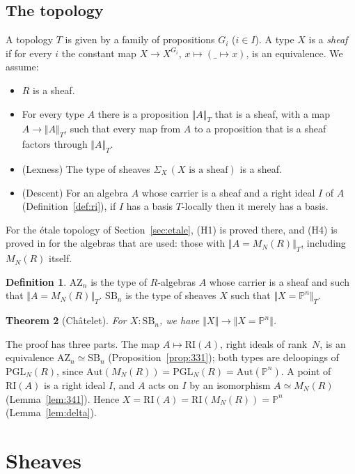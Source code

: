 \documentclass[11pt]{amsart}
\newtheorem{theorem}{Theorem}[section]
\theoremstyle{definition}
\newtheorem{definition}[theorem]{Definition}
\theoremstyle{remark}
\newcommand{\Pn}{\mathbb{P}^n}
\newcommand{\M}{M_N(R)}
\newcommand{\AZ}{\mathrm{AZ}_n}
\newcommand{\SB}{\mathrm{SB}_n}
\newcommand{\RI}{\mathrm{RI}}
\newcommand{\PGL}{\mathrm{PGL}_N(R)}
\newcommand{\Aut}{\mathrm{Aut}}
\newcommand{\tr}[1]{\Vert #1\Vert}
\newcommand{\trT}[1]{\Vert #1\Vert_T}
\begin{document}
\subsection*{The topology}
A topology $T$ is given by a family of propositions $G_i$ ($i\in I$). A type
$X$ is a \emph{sheaf} if for every $i$ the constant map $X\to X^{G_i}$,
$x\mapsto(\_\mapsto x)$, is an equivalence. We assume:
\begin{itemize}
\item[(H1)] $R$ is a sheaf.
\item[(H2)] For every type $A$ there is a proposition $\trT{A}$ that is a
  sheaf, with a map $A\to\trT A$, such that every map from $A$ to a
  proposition that is a sheaf factors through $\trT A$.
\item[(H3)] (Lexness) The type of sheaves $\Sigma_{X} \,(X\text{ is a sheaf})$
  is a sheaf.
\item[(H4)] (Descent) For an algebra $A$ whose carrier is a sheaf and a
  right ideal $I$ of $A$ (Definition~\ref{def:ri}), if $I$ has a basis
  $T$-locally then it merely has a basis.
\end{itemize}
For the \'etale topology of Section~\ref{sec:etale}, (H1) is proved there,
and (H4) is proved in \cite{descent} for the algebras that are used:
those with $\trT{A=\M}$, including $\M$ itself.

\begin{definition}
$\AZ$ is the type of $R$-algebras $A$ whose carrier is a sheaf and such that
$\trT{A=\M}$. $\SB$ is the type of sheaves $X$ such that $\trT{X=\Pn}$.
\end{definition}

\begin{theorem}[Ch\^atelet]\label{thm:main}
For $X:\SB$, we have $\tr X\to\tr{X=\Pn}$.
\end{theorem}

The proof has three parts. The map $A\mapsto\RI(A)$, right ideals of
rank~$N$, is an equivalence $\AZ\simeq\SB$
(Proposition~\ref{prop:331}); both types are deloopings of $\PGL$, since
$\Aut(\M)=\PGL=\Aut(\Pn)$. A point of $\RI(A)$ is a right ideal $I$, and
$A$ acts on $I$ by an isomorphism $A\simeq\M$ (Lemma~\ref{lem:341}). Hence
$X=\RI(A)=\RI(\M)=\Pn$ (Lemma~\ref{lem:delta}).

\section{Sheaves}
\end{document}
